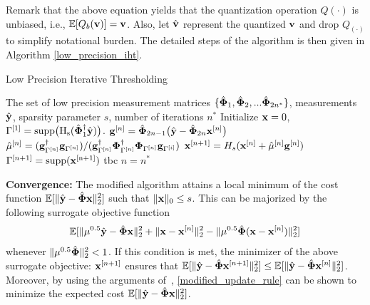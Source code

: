 \documentclass{article}
\begin{document}
Remark that the above equation yields that the quantization operation $Q(\cdot)$ is unbiased, i.e., $\mathbb{E}[Q_b({\bf v})] = {\bf v}$. Also, let $\hat{{\bf v}}$ represent the quantized ${\bf v}$ and drop $Q_(\cdot)$ to simplify notational burden. The detailed steps of the algorithm is then given in Algorithm \ref{low_precision_iht}.
\begin{algorithm}[h!]
   \caption{Low Precision Iterative Thresholding}
   \label{low_precision_iht}
\begin{algorithmic}
    The set of low precision measurement matrices $\{ \hat{\bf \Phi}_1, \hat{\bf \Phi}_2, ...\hat{\bf \Phi}_{2n^*}\}$, measurements $\hat{\bf y}$, sparsity parameter $s$, number of iterations $n^*$ 
   \REPEAT
   \STATE Initialize ${\bf x} = 0$, $\Gamma^{[1]} = \rm{supp}\big (H_s(\hat{\bf \Phi}_1^{\dagger}{\hat{\bf y}})\big)$.
   \STATE ${\bf g}^{[n]} = {\hat{\bf \Phi}}_{2n-1} \big(\hat{{\bf y}}-{\hat{\bf \Phi}}_{2n}{\bf x}^{[n]}\big)$
   \STATE $\hat{\bf \mu}^{[n]} = ({\bf g}^{\dagger}_{\Gamma^{[n]}}{\bf g}_{\Gamma^{[n]}})/({\bf g}^{\dagger}_{\Gamma^{[n]}}{\bf \Phi}^{\dagger}_{\Gamma^{[n]}}{\bf \Phi}_{\Gamma^{[n]}}{\bf g}_{\Gamma^{[i]}})$
   \STATE ${\bf x}^{[n+1]} = H_s({\bf x}^{[n]} + \hat{\bf \mu}^{[n]} {\bf g}^{[n]})$
   \STATE $\Gamma^{[n+1]} = \rm{supp}({\bf x}^{[n+1]})$
   \STATE tbc
   \ENDFOR
   \UNTIL $n = n^*$
\end{algorithmic}
\end{algorithm}

{\bf Convergence:} The modified algorithm attains a local minimum of the cost function $\mathbb{E} [ \| \hat{\bf y} - \hat{\bf \Phi}{\bf x}\|_2^2]$ such that $\|{\bf x}\|_0 \leq s$. This can be majorized by the following surrogate objective function 
\begin{equation*}
    \begin{split}
        \mathbb{E} [\|\mu^{0.5}\hat{\bf y} -   \hat{\bf \Phi}{\bf x}\|_2^2+ \|{\bf x} 
    - {\bf x}^{[n]} \|_2^2
    - \|\mu^{0.5}\hat{\bf \Phi}({\bf x}- {\bf x}^{[n]}) \|_2^2] 
    \end{split}
\end{equation*}
whenever $\| \mu^{0.5}\hat{\bf \Phi}\|_2^2 <1$. If this condition is met, the minimizer of the above surrogate objective: ${\bf x}^{[n+1]}$ ensures that $\mathbb{E} [\| \hat{\bf y} - \hat{\bf \Phi}{\bf x}^{[n+1]}\|_2^2] \leq \mathbb{E}[ \| \hat{\bf y} - \hat{\bf \Phi}{\bf x}^{[n]}\|_2^2]$. Moreover, by using the arguments of~\cite{blumensath2008iht}, \ref{modified_update_rule} can be shown to minimize the expected cost $\mathbb{E} [ \| \hat{\bf y} - \hat{\bf \Phi}{\bf x}\|_2^2]$.
\end{document}
